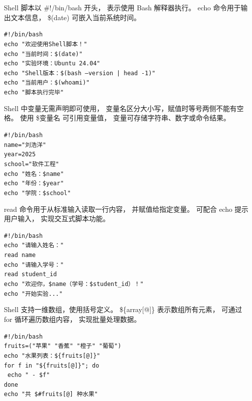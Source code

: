 \documentclass[a4paper, 12pt]{article}
\begin{document}
\begin{tcolorbox}[instancestyle, title=实例5：编写第一个Shell脚本]
Shell 脚本以 \#!/bin/bash 开头，
表示使用 Bash 解释器执行。
echo 命令用于输出文本信息，
\$(date) 可嵌入当前系统时间。

\texttt{\#!/bin/bash} \\
\texttt{echo "欢迎使用Shell脚本！"} \\
\texttt{echo "当前时间：\$(date)"} \\
\texttt{echo "实验环境：Ubuntu 24.04"} \\
\texttt{echo "Shell版本：\$(bash --version | head -1)"} \\
\texttt{echo "当前用户：\$(whoami)"} \\
\texttt{echo "脚本执行完毕"}
\end{tcolorbox}

\begin{tcolorbox}[instancestyle, title=实例6：Shell变量定义与使用]
Shell 中变量无需声明即可使用，
变量名区分大小写，赋值时等号两侧不能有空格。
使用 \$变量名 可引用变量值，
变量可存储字符串、数字或命令结果。

\texttt{\#!/bin/bash} \\
\texttt{name="刘浩洋"} \\
\texttt{year=2025} \\
\texttt{school="软件工程"} \\
\texttt{echo "姓名：\$name"} \\
\texttt{echo "年份：\$year"} \\
\texttt{echo "学院：\$school"}
\end{tcolorbox}

\begin{tcolorbox}[instancestyle, title=实例7：使用read读取用户输入]
read 命令用于从标准输入读取一行内容，
并赋值给指定变量。
可配合 echo 提示用户输入，
实现交互式脚本功能。

\texttt{\#!/bin/bash} \\
\texttt{echo "请输入姓名："} \\
\texttt{read name} \\
\texttt{echo "请输入学号："} \\
\texttt{read student_id} \\
\texttt{echo "欢迎你，\$name（学号：\$student_id）！"} \\
\texttt{echo "开始实验..."}
\end{tcolorbox}

\begin{tcolorbox}[instancestyle, title=实例8：Shell数组操作]
Shell 支持一维数组，使用括号定义。
\$\{array[@]\} 表示数组所有元素，
可通过 for 循环遍历数组内容，
实现批量处理数据。

\texttt{\#!/bin/bash} \\
\texttt{fruits=("苹果" "香蕉" "橙子" "葡萄")} \\
\texttt{echo "水果列表：\$\{fruits[@]\}"} \\
\texttt{for f in "\$\{fruits[@]\}"; do} \\
\texttt{  echo " - \$f"} \\
\texttt{done} \\
\texttt{echo "共 \${#fruits[@]} 种水果"}
\end{tcolorbox}
\end{document}

